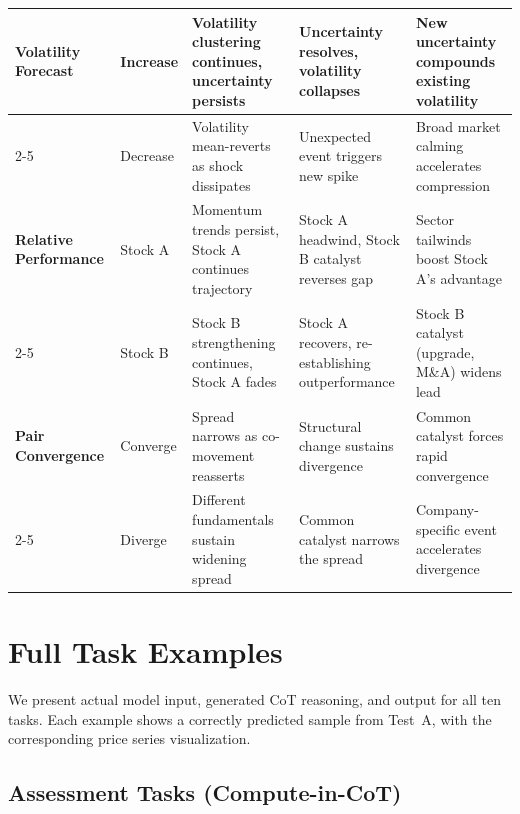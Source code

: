 \begin{table}[h]
{\begin{tabular}{l|l|p{4cm}|p{4cm}|p{4cm}}
\midrule
\multirow{4.5}{*}{\textbf{Volatility Forecast}} & Increase & Volatility clustering continues, uncertainty persists & Uncertainty resolves, volatility collapses & New uncertainty compounds existing volatility \\
\cmidrule{2-5}
 & Decrease & Volatility mean-reverts as shock dissipates & Unexpected event triggers new spike & Broad market calming accelerates compression \\
\midrule
\multirow{4.5}{*}{\textbf{Relative Performance}} & Stock A & Momentum trends persist, Stock A continues trajectory & Stock A headwind, Stock B catalyst reverses gap & Sector tailwinds boost Stock A's advantage \\
\cmidrule{2-5}
 & Stock B & Stock B strengthening continues, Stock A fades & Stock A recovers, re-establishing outperformance & Stock B catalyst (upgrade, M\&A) widens lead \\
\midrule
\multirow{4.5}{*}{\textbf{Pair Convergence}} & Converge & Spread narrows as co-movement reasserts & Structural change sustains divergence & Common catalyst forces rapid convergence \\
\cmidrule{2-5}
 & Diverge & Different fundamentals sustain widening spread & Common catalyst narrows the spread & Company-specific event accelerates divergence \\
\bottomrule
\end{tabular}
}
\end{table}

\clearpage
\section{Full Task Examples}
\label{app:tasks}

We present actual model input, generated CoT reasoning, and output for all ten tasks. Each example shows a correctly predicted sample from Test~A, with the corresponding price series visualization.

\subsection{Assessment Tasks (Compute-in-CoT)}

